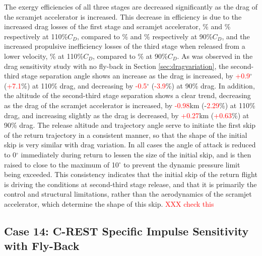 The exergy efficiencies of all three stages are decreased significantly as the drag of the scramjet accelerator is increased. This decrease in efficiency is due to the increased drag losses of the first stage and scramjet accelerator, \WDoneCdOneHundredTen\% and \WDsecondCdOneHundredTen\% respectively at 110\%$C_D$, compared to \WDoneCdNinety\% and \WDsecondCdNinety\% respectively at 90\%$C_D$, and the increased propulsive inefficiency losses of the third stage when released from a lower velocity, \PlossthreeCombinedCdOneHundredTen\% at 110\%$C_D$, compared to \PlossthreeCombinedCdNinety \% at 90\%$C_D$.
As was observed in the drag sensitivity study with no fly-back in Section \ref{sec:dragvariation}, the second-third stage separation angle shows an increase as the drag is increased, by \textcolor{red}{+0.9}$^\circ$ (\textcolor{red}{+7.1}\%) at 110\% drag, and decreasing by \textcolor{red}{-0.5}$^\circ$ (\textcolor{red}{-3.9}\%) at 90\% drag. In addition, the altitude of the second-third stage separation shows a clear trend, decreasing as the drag of the scramjet accelerator is increased, by \textcolor{red}{-0.98}km (-\textcolor{red}{2.29}\%) at 110\% drag, and increasing slightly as the drag is decreased, by \textcolor{red}{+0.27}km (\textcolor{red}{+0.63}\%) at 90\% drag.  
The release altitude and trajectory angle serve to initiate the first skip of the return trajectory in a consistent manner, so that the shape of the initial skip is very similar with drag variation. In all cases the angle of attack is reduced to 0$^\circ$ immediately during return to lessen the size of the initial skip, and is then raised to close to the maximum of 10$^\circ$ to prevent the dynamic pressure limit being exceeded. This consistency indicates that the initial skip of the return flight is driving the conditions at second-third stage release, and that it is primarily the control and structural limitations, rather than the aerodynamics of the scramjet accelerator, which determine the shape of this skip.  \textcolor{red}{XXX check this}


\subsection{Case 14: C-REST Specific Impulse Sensitivity with Fly-Back}


